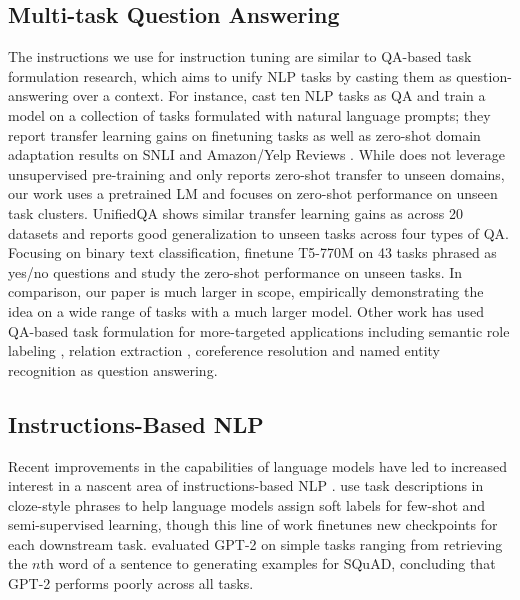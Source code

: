 \documentclass{article} %
\begin{document}
\subsection{Multi-task Question Answering}
The instructions we use for instruction tuning are similar to QA-based task formulation research, which aims to unify NLP tasks by casting them as question-answering over a context.
For instance, \citet{mccann2018natural} cast ten NLP tasks as QA and train a model on a collection of tasks formulated with natural language prompts;
they report transfer learning gains on finetuning tasks as well as zero-shot domain adaptation results on SNLI \citep{bowman-etal-2015-large} and Amazon/Yelp Reviews \citep{amazonyelp2015}.
While \citet{mccann2018natural} does not leverage unsupervised pre-training and only reports zero-shot transfer to unseen domains, our work uses a pretrained LM and focuses on zero-shot performance on unseen task clusters.
UnifiedQA \citep{khashabi-etal-2020-unifiedqa} shows similar transfer learning gains as \citet{mccann2018natural} across 20 datasets and reports good generalization to unseen tasks across four types of QA. 
Focusing on binary text classification, \citet{zhong2021meta} finetune T5-770M on 43 tasks phrased as yes/no questions and study the zero-shot performance on unseen tasks. 
In comparison, our paper is much larger in scope, empirically demonstrating the idea on a wide range of tasks with a much larger model.
Other work has used QA-based task formulation for more-targeted applications including semantic role labeling \citep{he-etal-2015-question}, relation extraction \citep{levy-etal-2017-zero}, coreference resolution \citep{wu-etal-2020-corefqa} and named entity recognition \citep{li-etal-2020-unified} as question answering.

\subsection{Instructions-Based NLP}
Recent improvements in the capabilities of language models have led to increased interest in a nascent area of instructions-based NLP \citep[][and see \citet{mccarthy1960programs}]{goldwasser2014learning}.
\citet{schick-schutze-2021-exploiting} \citep[also see][]{gao-etal-2021-making,tam2021adapet} use task descriptions in cloze-style phrases to help language models assign soft labels for few-shot and semi-supervised learning, though this line of work finetunes new checkpoints for each downstream task.
\citet{efrat2020turking} evaluated GPT-2 \citep{radford2019language} on simple tasks ranging from retrieving the $n$th word of a sentence to generating examples for SQuAD, concluding that GPT-2 performs poorly across all tasks.
\end{document}
